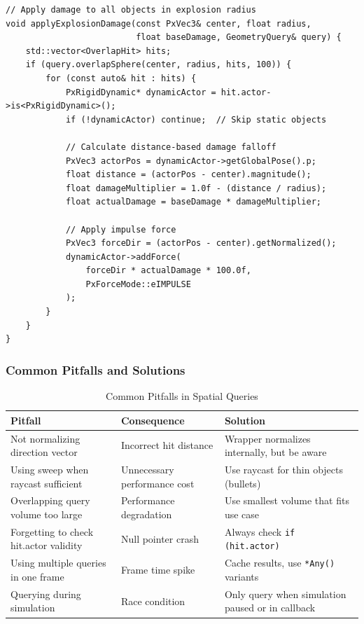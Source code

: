 \begin{lstlisting}[style=cpp]
// Apply damage to all objects in explosion radius
void applyExplosionDamage(const PxVec3& center, float radius,
                          float baseDamage, GeometryQuery& query) {
    std::vector<OverlapHit> hits;
    if (query.overlapSphere(center, radius, hits, 100)) {
        for (const auto& hit : hits) {
            PxRigidDynamic* dynamicActor = hit.actor->is<PxRigidDynamic>();
            if (!dynamicActor) continue;  // Skip static objects

            // Calculate distance-based damage falloff
            PxVec3 actorPos = dynamicActor->getGlobalPose().p;
            float distance = (actorPos - center).magnitude();
            float damageMultiplier = 1.0f - (distance / radius);
            float actualDamage = baseDamage * damageMultiplier;

            // Apply impulse force
            PxVec3 forceDir = (actorPos - center).getNormalized();
            dynamicActor->addForce(
                forceDir * actualDamage * 100.0f,
                PxForceMode::eIMPULSE
            );
        }
    }
}
\end{lstlisting}

\subsubsection{Common Pitfalls and Solutions}

\begin{table}[h]
\centering
\small
\begin{tabular}{|p{5cm}|p{5cm}|p{3cm}|}
\hline
\textbf{Pitfall} & \textbf{Consequence} & \textbf{Solution} \\
\hline
Not normalizing direction vector & Incorrect hit distance & Wrapper normalizes internally, but be aware \\
\hline
Using sweep when raycast sufficient & Unnecessary performance cost & Use raycast for thin objects (bullets) \\
\hline
Overlapping query volume too large & Performance degradation & Use smallest volume that fits use case \\
\hline
Forgetting to check hit.actor validity & Null pointer crash & Always check \texttt{if (hit.actor)} \\
\hline
Using multiple queries in one frame & Frame time spike & Cache results, use \texttt{*Any()} variants \\
\hline
Querying during simulation & Race condition & Only query when simulation paused or in callback \\
\hline
\end{tabular}
\caption{Common Pitfalls in Spatial Queries}
\end{table}

